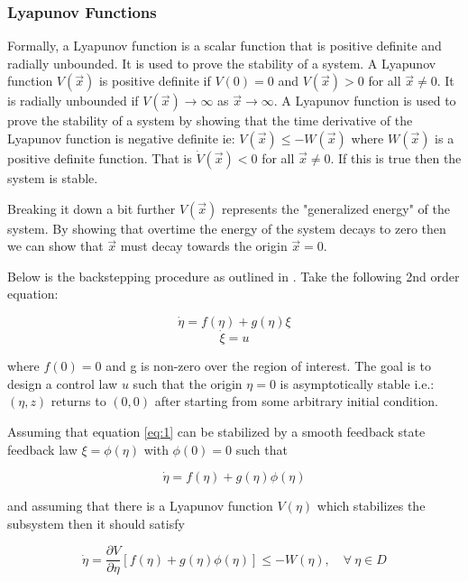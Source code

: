 \subsubsection{Lyapunov Functions}
Formally, a Lyapunov function is a scalar function that is positive definite and radially unbounded. It is used to prove the stability of a system. A Lyapunov function $V(\vec{x})$ is positive definite if $V(0)=0$ and $V(\vec{x})>0$ for all $\vec{x}\neq0$. It is radially unbounded if $V(\vec{x})\rightarrow\infty$ as $\vec{x}\rightarrow\infty$. A Lyapunov function is used to prove the stability of a system by showing that the time derivative of the Lyapunov function is negative definite ie: $V(\vec{x}) \leq -W(\vec{x})$ where $W(\vec{x})$ is a positive definite function. That is $\dot{V}(\vec{x})<0$ for all $\vec{x}\neq0$. If this is true then the system is stable. 

Breaking it down a bit further $V(\vec{x})$ represents the "generalized energy" of the system. By showing that overtime the energy of the system decays to zero then we can show that $\vec{x}$ must decay towards the origin $\vec{x}=0$.

\par 
Below is the backstepping procedure as outlined in \cite{khalilNonlinearSystems2002}. Take the following 2nd order equation:

\begin{equation}
    \dot{\eta} = f(\eta) + g(\eta)\xi \label{eq:1}
\end{equation}
\begin{equation}
    \dot{\xi} = u
\end{equation}

where $f(0)=0$ and g is non-zero over the region of interest.
The goal is to design a control law $u$ such that the origin $\eta=0$ is asymptotically stable i.e.: $(\eta, z)$ returns to $(0,0)$ after starting from some arbitrary initial condition.

Assuming that equation \ref{eq:1} can be stabilized by a smooth feedback state feedback law $\xi=\phi(\eta)$ with $\phi(0)=0$ such that 

$$
    \dot{\eta} = f(\eta) + g(\eta)\phi(\eta)
$$

and assuming that there is a Lyapunov function $V(\eta)$ which stabilizes the subsystem then it should satisfy

\begin{equation}
\dot{\eta} = \frac{\partial V}{\partial \eta}[f(\eta) + g(\eta)\phi(\eta)] \leq -W(\eta), \quad \forall \ \eta \in D
\end{equation}

